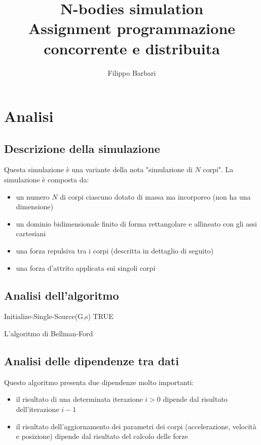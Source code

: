 \documentclass[12pt,a4paper,oneside]{article}
\begin{document}
	
	\title{N-bodies simulation\\Assignment programmazione concorrente e distribuita}
	\author{Filippo Barbari}
	\date{}%
	\maketitle
	
	\tableofcontents
	\newpage
	
	\section{Analisi}
	\subsection{Descrizione della simulazione}
	Questa simulazione è una variante della nota "simulazione di $N$ corpi". La simulazione è composta da:
	\begin{itemize}
		\item un numero $N$ di corpi ciascuno dotato di massa ma incorporeo (non ha una dimensione)
		\item un dominio bidimensionale finito di forma rettangolare e allineato con gli assi cartesiani
		\item una forza repulsiva tra i corpi (descritta in dettaglio di seguito)
		\item una forza d'attrito applicata sui singoli corpi
	\end{itemize}
	
	\subsection{Analisi dell'algoritmo}
	\begin{algorithm}
		Initialize-Single-Source(G,s)\;
		\Return TRUE\;
		\caption{L'algoritmo di Bellman-Ford}
	\end{algorithm}
	
	\subsection{Analisi delle dipendenze tra dati}
	Questo algoritmo presenta due dipendenze molto importanti:
	\begin{itemize}
		\item il risultato di una determinata iterazione $i > 0$ dipende dal risultato dell'iterazione $i-1$
		\item il risultato dell'aggiornamento dei parametri dei corpi (accelerazione, velocità e posizione) dipende dal risultato del calcolo delle forze
	\end{itemize}
	
\end{document}
